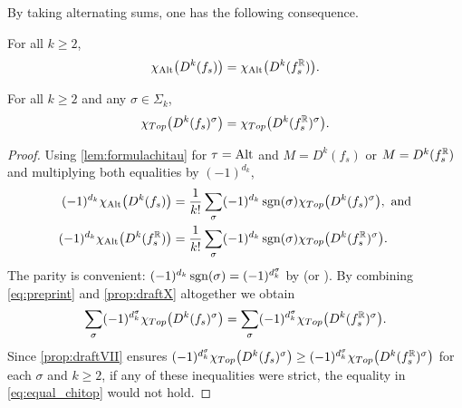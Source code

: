 \documentclass[a4paper,12pt]{amsart}
\begin{document}


By taking alternating sums, one has the following consequence.

\begin{corollary}\label{prop:draftX}
For all $k\geq2$,
\[ \chi_{\textnormal{Alt}}\big(D^k (f_s)\big)=\chi_{\textnormal{Alt}}\big(D^k(f_s^{\mathbb{R}})\big).\]
\end{corollary}

\begin{corollary}\label{prop:draftXI}
For all $k\geq2$ and any $\sigma\in\Sigma_k$,
\[ \chi_{Top}\big(D^k(f_s)^\sigma\big)=\chi_{Top}\big(D^k(f_s^{\mathbb{R}})^\sigma\big).\]
\end{corollary}
\begin{proof}
Using \cref{lem:formulachitau} for $\tau=\textnormal{Alt}$ and $M=D^k(f_s)$ or $M=D^k(f_s^{\mathbb{R}})$ and multiplying both equalities by $(-1)^{d_k}$,
\begin{equation}\label{eq:preprint}\begin{aligned}
(-1)^{d_k}\chi_{\textnormal{Alt}}\big(D^k(f_s)\big)&=\frac{1}{k!}\sum_\sigma(-1)^{d_k}\operatorname{sgn}(\sigma)\chi_{Top}\big(D^k(f_s)^\sigma\big),\text{ and}\\
(-1)^{d_k}\chi_{\textnormal{Alt}}\big(D^k(f_s^{\mathbb{R}})\big)&=\frac{1}{k!}\sum_\sigma(-1)^{d_k}\operatorname{sgn}(\sigma)\chi_{Top}\big(D^k(f_s^{\mathbb{R}})^\sigma\big).
\end{aligned}\end{equation}
The parity is convenient: $(-1)^{d_k}\operatorname{sgn}(\sigma)=(-1)^{d_k^\sigma}$ by \cite[Lemma 4.4]{GimenezConejero2022c} (or \cite[Lemma 6.3.2]{Robertothesis}).
By combining \cref{eq:preprint} and \cref{prop:draftX} altogether we obtain
\begin{equation}\label{eq:equal_chitop}
    \sum_{\sigma} (-1)^{d_k^\sigma}\chi_{Top}\big(D^k(f_s)^\sigma\big)  = \sum_{\sigma} (-1)^{d_k^\sigma}\chi_{Top}\big(D^k(f_s^{\mathbb{R}})^\sigma\big).
\end{equation}
Since \cref{prop:draftVII} ensures $(-1)^{d_k^\sigma}\chi_{Top}\big(D^k(f_s)^\sigma\big) \geq (-1)^{d_k^\sigma}\chi_{Top}\big(D^k(f_s^{\mathbb{R}})^\sigma\big)$ for each $\sigma$ and $k\geq 2$, if any of these inequalities were strict, the equality in \cref{eq:equal_chitop} would not hold.
\end{proof}
\end{document}
